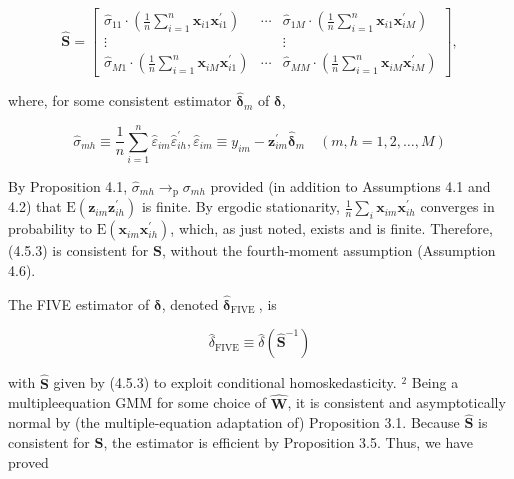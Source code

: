 \documentclass[10pt]{article}
\begin{document}
\[
\widehat{\mathbf{S}}=\left[\begin{array}{ccc}
\hat{\sigma}_{11} \cdot\left(\frac{1}{n} \sum_{i=1}^{n} \mathbf{x}_{i 1} \mathbf{x}_{i 1}^{\prime}\right) & \cdots & \hat{\sigma}_{1 M} \cdot\left(\frac{1}{n} \sum_{i=1}^{n} \mathbf{x}_{i 1} \mathbf{x}_{i M}^{\prime}\right)  \tag{4.5.3}\\
\vdots & & \vdots \\
\hat{\sigma}_{M 1} \cdot\left(\frac{1}{n} \sum_{i=1}^{n} \mathbf{x}_{i M} \mathbf{x}_{i 1}^{\prime}\right) & \cdots & \hat{\sigma}_{M M} \cdot\left(\frac{1}{n} \sum_{i=1}^{n} \mathbf{x}_{i M} \mathbf{x}_{i M}^{\prime}\right)
\end{array}\right],
\]

where, for some consistent estimator $\hat{\boldsymbol{\delta}}_{m}$ of $\boldsymbol{\delta}$,


\begin{equation*}
\hat{\sigma}_{m h} \equiv \frac{1}{n} \sum_{i=1}^{n} \hat{\varepsilon}_{i m} \hat{\varepsilon}_{i h}^{\prime}, \hat{\varepsilon}_{i m} \equiv y_{i m}-\mathbf{z}_{i m}^{\prime} \hat{\boldsymbol{\delta}}_{m} \quad(m, h=1,2, \ldots, M) \tag{4.5.4}
\end{equation*}


By Proposition 4.1, $\hat{\sigma}_{m h} \rightarrow_{\mathrm{p}} \sigma_{m h}$ provided (in addition to Assumptions 4.1 and 4.2) that $\mathrm{E}\left(\mathbf{z}_{i m} \mathbf{z}_{i h}^{\prime}\right)$ is finite. By ergodic stationarity, $\frac{1}{n} \sum_{i} \mathbf{x}_{i m} \mathbf{x}_{i h}^{\prime}$ converges in probability to $\mathrm{E}\left(\mathbf{x}_{i m} \mathbf{x}_{i h}^{\prime}\right)$, which, as just noted, exists and is finite. Therefore, (4.5.3) is consistent for $\mathbf{S}$, without the fourth-moment assumption (Assumption 4.6).

The FIVE estimator of $\boldsymbol{\delta}$, denoted $\hat{\boldsymbol{\delta}}_{\text {FIVE }}$, is

$$
\hat{\delta}_{\mathrm{FIVE}} \equiv \hat{\delta}\left(\widehat{\mathbf{S}}^{-1}\right)
$$

with $\widehat{\mathbf{S}}$ given by (4.5.3) to exploit conditional homoskedasticity. ${ }^{2}$ Being a multipleequation GMM for some choice of $\widehat{\mathbf{W}}$, it is consistent and asymptotically normal by (the multiple-equation adaptation of) Proposition 3.1. Because $\widehat{\mathbf{S}}$ is consistent for $\mathbf{S}$, the estimator is efficient by Proposition 3.5. Thus, we have proved
\end{document}
